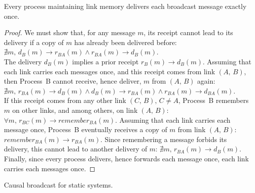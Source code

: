 \begin{theorem}
  Every process maintaining link memory delivers each broadcast message exactly
  once.
\end{theorem}

\begin{proof}
  We must show that, for any message $m$, its receipt cannot lead to its
  delivery if a copy of $m$ has already been delivered before:
  $\nexists m,\, d_B(m) \rightarrow r_{BA}(m) \wedge r_{BA}(m) \rightarrow
  d_B(m)$.\\
  The delivery $d_B(m)$ implies a prior receipt $r_B(m) \rightarrow d_B(m)$.
  Assuming that each link carries each messages once, and this receipt comes
  from link $(A,\, B)$, then Process~B cannot receive, hence deliver, $m$ from
  $(A,\, B)$ again:
  $\nexists m,\, r_{BA}(m) \rightarrow d_B(m) \wedge d_B(m) \rightarrow
  r_{BA}(m) \wedge r_{BA}(m) \rightarrow d_{BA}(m)$.\\
  If this receipt comes from any other link $(C,\, B),\, C\neq A$, Process~B
  remembers $m$ on other links, and among others, on link $(A,\, B)$:
  $\forall m,\, r_{BC}(m) \rightarrow remember_{BA}(m)$. Assuming that each link
  carries each message once, Process~B eventually receives a copy of $m$ from
  link $(A,\,B)$: $remember_{BA}(m) \rightarrow r_{BA}(m)$. Since remembering a
  message forbids its delivery, this cannot lead to another
  delivery of $m$: $\nexists m,\, r_{BA}(m) \rightarrow d_{B}(m)$.\\
  Finally, since every process delivers, hence forwards each message once, each
  link carries each messages once.
  
\end{proof}


\begin{algorithm}[h]
  
  \caption{\label{algo:reliablebroadcast}Causal broadcast for static systems.}
\end{algorithm}

